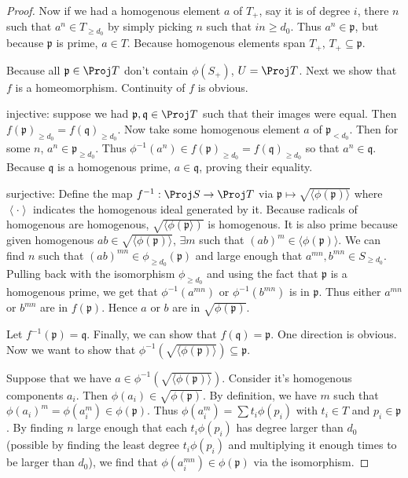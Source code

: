 \begin{proof}
	Now if we had a homogenous element $a $ of $T_+ $, say it is of degree $i $, there $n $ such that $a^n \in T_{\ge d_{0}} $ by simply picking $n $ such that $in \ge d_{0} $.
	Thus $a^n \in \mathfrak{p} $, but because $\mathfrak{p} $ is prime, $a \in T $.
	Because homogenous elements span $T_+ $, $T_+ \subseteq \mathfrak{p} $.

	Because all $\mathfrak{p}\in \Proj T $ don't contain $\phi(S_+)$, $U = \Proj T $.
	Next we show that $f $ is a homeomorphism.
	Continuity of $f $ is obvious.

	injective: suppose we had $\mathfrak{p},\mathfrak{q}\in \Proj T $ such that their images were equal.
	Then $f(\mathfrak{p})_{\ge d_{0}} = f(\mathfrak{q})_{\ge d_{0}} $.
	Now take some homogenous element $a $ of $\mathfrak{p}_{< d_{0}} $.
	Then for some $n $, $a^n \in \mathfrak{p}_{\ge d_{0}} $.
	Thus $\phi ^{-1}(a^n) \in f(\mathfrak{p})_{\ge d_{0}} = f(\mathfrak{q})_{\ge d_{0}} $ so that $a^n \in \mathfrak{q} $.
	Because $\mathfrak{q}$ is a homogenous prime, $a \in \mathfrak{q}$, proving their equality.

	surjective:
	Define the map $f^{-1}:\Proj S\to \Proj T $ via $\mathfrak{p} \mapsto \sqrt{\langle \phi(\mathfrak{p})\rangle} $ where $\left< \cdot \right> $ indicates the homogenous ideal generated by it.
	Because radicals of homogenous are homogenous, $\sqrt{\langle\phi (\mathfrak{p}\rangle)}  $ is homogenous.
	It is also prime because given homogenous $ab \in \sqrt{\langle\phi (\mathfrak{p})\rangle} $, $\exists m $ such that $(ab)^m \in \langle\phi (\mathfrak{p}) \rangle$.
	We can find $n $ such that $(ab)^{mn} \in \phi _{\ge d_{0}}(\mathfrak{p}) $ and large enough that $a^{mn}, b^{mn} \in S_{\ge d_{0}}  $.
	Pulling back with the isomorphism $\phi _{\ge d_{0}} $ and using the fact that $\mathfrak{p} $ is a homogenous prime, we get that $\phi ^{-1} (a^{mn})$ or $\phi ^{-1}(b^{mn})$ is in $\mathfrak{p} $.
	Thus either $a^{mn}  $ or $b^{mn}  $ are in $f(\mathfrak{p}) $.
	Hence $a $ or $b $ are in $\sqrt{\phi (\mathfrak{p})} $.

	Let $f^{-1}(\mathfrak{p}) = \mathfrak{q} $.
	Finally, we can show that $f(\mathfrak{q}) = \mathfrak{p} $.
	One direction is obvious.
	Now we want to show that $\phi ^{-1}(\sqrt{\langle\phi (\mathfrak{p})\rangle} ) \subseteq \mathfrak{p} $.

	Suppose that we have $a \in \phi ^{-1}(\sqrt{\langle\phi (\mathfrak{p})\rangle} ) $.
	Consider it's homogenous components $a_i $.
	Then $\phi (a_i) \in \sqrt{\phi (\mathfrak{p})}$.
	By definition, we have $m $ such that $\phi (a_i)^m = \phi(a_i^m) \in \phi (\mathfrak{p}) $.
	Thus $\phi(a_i^m) = \sum t_i \phi(p_i) $ with $t_i \in T $ and $p_i \in \mathfrak{p} $.
	By finding $n $ large enough that each $t_i \phi (p_i) $ has degree larger than $d_{0} $ (possible by finding the least degree $t_i \phi (p_i) $ and multiplying it enough times to be larger than $d_{0} $), we find that $\phi (a_i^{mn}) \in \phi(\mathfrak{p})$ via the isomorphism.


\end{proof}
